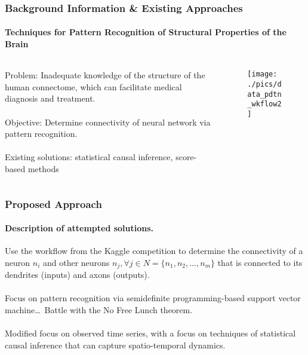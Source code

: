 \documentclass[xcolor={usenames,dvipsnames},hyperref={hyperindex,bookmarks}]{beamer}
\begin{document}
\begin{frame}
	\frametitle{Background Information \& Existing Approaches}
	\framesubtitle{Techniques for Pattern Recognition of Structural Properties of the Brain}
	
	\begin{columns}[t] %
		\begin{column}[T]{5cm} %
		
		Problem: Inadequate knowledge of the structure of the human connectome, which can facilitate medical diagnosis and treatment. \\
		\ \\
		Objective: Determine connectivity of neural network via pattern recognition. \\
		\ \\
		Existing solutions: statistical causal inference, score-based methods
		\end{column}
		
		\begin{column}[T]{5cm} %
			\begin{figure}
			\centering
			\texttt{[image: ./pics/data\_pdtn\_wkflow2]}
			\end{figure}
		\end{column}
	\end{columns}
\end{frame}



\begin{frame}
	\frametitle{Proposed Approach}
	\framesubtitle{Description of attempted solutions.}
	
	Use the workflow from the Kaggle competition \cite{ChaLearn2014a,Stetter2012} to determine the connectivity of a neuron $n_{i}$ and other neurons $n_{j}, \forall j \in N = \{n_{1}, n_{2}, \dots, n_{m}\}$ that is connected to its dendrites (inputs) and axons (outputs). \\
	\ \\
	Focus on pattern recognition via semidefinite programming-based support vector machine\dots\ Battle with the No Free Lunch theorem. \\
	\ \\
	Modified focus on observed time series, with a focus on techniques of statistical causal inference that can capture spatio-temporal dynamics.
\end{frame}
\end{document}
